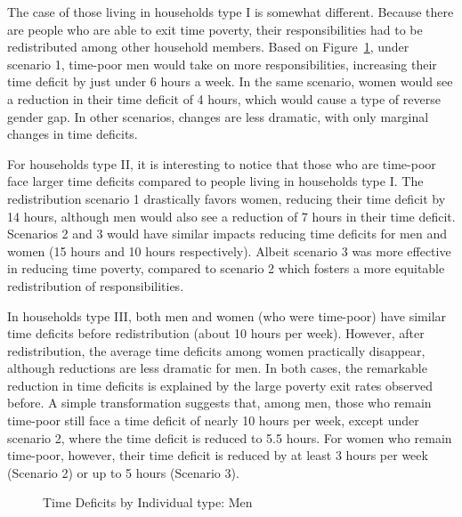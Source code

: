 \documentclass[
  11pt,
]{article}
\begin{document}
The case of those living in households type I is somewhat different.
Because there are people who are able to exit time poverty, their
responsibilities had to be redistributed among other household members.
Based on Figure~\ref{fig-def1}, under scenario 1, time-poor men would
take on more responsibilities, increasing their time deficit by just
under 6 hours a week. In the same scenario, women would see a reduction
in their time deficit of 4 hours, which would cause a type of reverse
gender gap. In other scenarios, changes are less dramatic, with only
marginal changes in time deficits.

For households type II, it is interesting to notice that those who are
time-poor face larger time deficits compared to people living in
households type I. The redistribution scenario 1 drastically favors
women, reducing their time deficit by 14 hours, although men would also
see a reduction of 7 hours in their time deficit. Scenarios 2 and 3
would have similar impacts reducing time deficits for men and women (15
hours and 10 hours respectively). Albeit scenario 3 was more effective
in reducing time poverty, compared to scenario 2 which fosters a more
equitable redistribution of responsibilities.

In households type III, both men and women (who were time-poor) have
similar time deficits before redistribution (about 10 hours per week).
However, after redistribution, the average time deficits among women
practically disappear, although reductions are less dramatic for men. In
both cases, the remarkable reduction in time deficits is explained by
the large poverty exit rates observed before. A simple transformation
suggests that, among men, those who remain time-poor still face a time
deficit of nearly 10 hours per week, except under scenario 2, where the
time deficit is reduced to 5.5 hours. For women who remain time-poor,
however, their time deficit is reduced by at least 3 hours per week
(Scenario 2) or up to 5 hours (Scenario 3).

\begin{figure}[H]


\caption{\label{fig-def1}Time Deficits by Individual type: Men}

\end{figure}%
\end{document}
